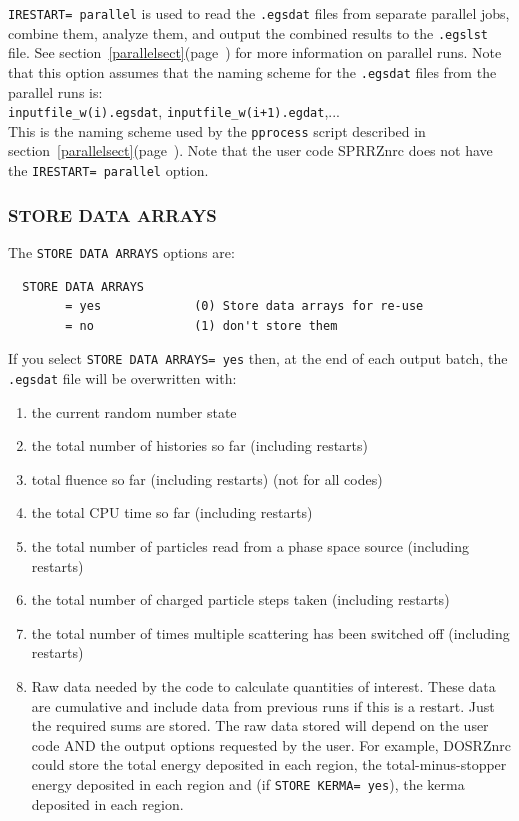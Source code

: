 \documentclass[12pt,twoside]{article}  %
\newcommand{\lpage}[1]{(page~\pageref{#1})}
\begin{document}
{\tt IRESTART= parallel} is used to read the {\tt .egsdat} files from
separate parallel jobs, combine them, analyze them, and output the
combined results to the {\tt .egslst} file.  See
section~\ref{parallelsect}\lpage{parallelsect}
for more information on parallel runs.  Note that this option assumes
that the naming scheme for the {\tt .egsdat} files from the parallel runs
is:\\
{\tt inputfile\_w(i).egsdat}, {\tt inputfile\_w(i+1).egdat},... \\
This is the naming scheme used by the {\tt pprocess} script described
in section~\ref{parallelsect}\lpage{parallelsect}.  Note that the user
code SPRRZnrc does not have the {\tt IRESTART= parallel} option.

\subsubsection{STORE DATA ARRAYS}
\label{dataarrsect}

The {\tt STORE DATA ARRAYS} options are:

\begin{verbatim}
  STORE DATA ARRAYS
        = yes             (0) Store data arrays for re-use
        = no              (1) don't store them
\end{verbatim}

If you select {\tt STORE DATA ARRAYS= yes} then, at the end of each output
batch, the {\tt .egsdat} file will be overwritten with:

\begin{enumerate}
\item the current random number state
\item the total number of histories so far (including restarts)
\item total fluence so far (including restarts) (not for all codes)
\item the total CPU time so far (including restarts)
\item the total number of particles read from a phase space source
        (including restarts)
\item the total number of charged particle steps taken (including restarts)
\item the total number of times multiple scattering has been switched off
      (including restarts)
\item Raw data needed by the code to calculate quantities of interest.
      These data are cumulative and include data from previous runs if
      this is a restart.  Just the required sums are stored.  The raw
      data stored will depend on the user code AND the output options
      requested by the user.  For example, DOSRZnrc could store the
      total energy deposited in each region, the total-minus-stopper
      energy deposited in each region and (if {\tt STORE KERMA= yes}),
      the kerma deposited in each region.
\end{enumerate}
\end{document}
